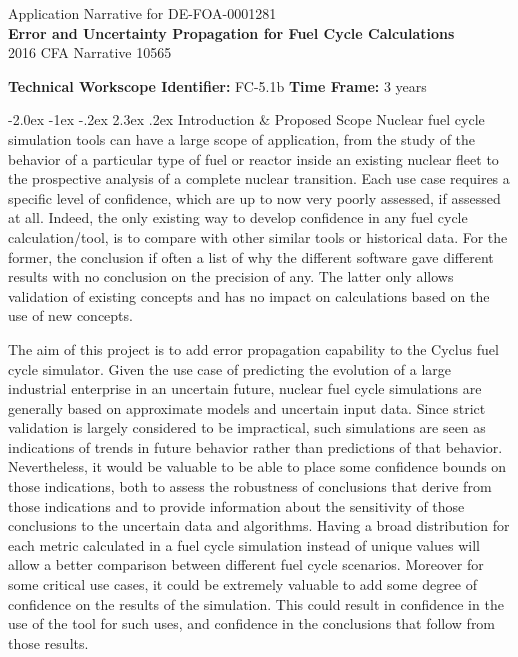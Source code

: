 \documentclass[dvips,11pt]{article}
\makeatletter
\renewcommand\section{\@startsection {section}{1}{\z@}%
                                   {-2.0ex \@plus -1ex \@minus -.2ex}%
                                   {2.3ex \@plus.2ex}%
                                   {\normalfont\bfseries}}%
\makeatother
\begin{document}
\begin{centering}
  Application Narrative for DE-FOA-0001281\\
  \textbf{\large Error and Uncertainty Propagation for Fuel Cycle Calculations}\\
  2016 CFA Narrative 10565\\
\end{centering}
\vspace{1em}

\noindent\textbf{Technical Workscope Identifier:} FC-5.1b \hspace{1.5in} \textbf{Time Frame:} 3 years

\section{Introduction \& Proposed Scope}
Nuclear fuel cycle simulation tools can have a large
scope of application, from the study of the
behavior of a particular type of fuel or reactor inside an
existing nuclear fleet to the prospective analysis
of a complete nuclear transition. 
Each use case
requires a specific level
of confidence, which are up to now very
poorly assessed, if assessed at all.
Indeed, the only existing way to develop confidence in
any fuel cycle calculation/tool, is to compare
with other similar tools or historical
data.  For the former, the conclusion if often 
a list of why the different software gave
different results with no conclusion on the
precision of any.  The latter only allows
validation of existing concepts and has no impact
on calculations based on the use of new
concepts.

The aim of this project is to add error
propagation capability to the Cyclus fuel cycle
simulator\cite{Cyclus_paper}. Given the use case of predicting the
evolution of a large industrial enterprise in an
uncertain future, nuclear fuel cycle simulations
are generally based on approximate models and
uncertain input data.  Since strict validation is largely
considered to be impractical, such simulations are
seen as indications of trends in future behavior rather than
predictions of that behavior. Nevertheless, it
would be valuable to be able to place some
confidence bounds on those indications, both to
assess the robustness of conclusions that derive
from those indications and to provide information
about the sensitivity of those conclusions to the
uncertain data and algorithms.  Having a broad
distribution for each metric calculated in a fuel
cycle simulation instead of unique values will
allow a better comparison between different fuel
cycle scenarios.  Moreover for some critical
use cases, it could be extremely valuable to add
some degree of confidence on the results of the simulation.
This could result in confidence in the use of the tool for
such uses, and confidence in the conclusions that follow
from those results.
\end{document}
